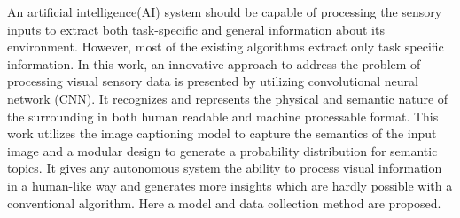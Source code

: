 An artificial intelligence(AI) system should be capable of processing the sensory inputs to extract both task-specific and general information about its environment. However, most of the existing algorithms extract only task specific information. In this work, an innovative approach to address the problem of processing visual sensory data is presented by utilizing convolutional neural network (CNN). It recognizes and represents the physical and semantic nature of the surrounding in both human readable and machine processable format. This work utilizes the image captioning model to capture the semantics of the input image and a modular design to generate a probability distribution for semantic topics. It gives any autonomous system the ability to process visual information in a human-like way and generates more insights which are hardly possible with a conventional algorithm. Here a model and data collection method are proposed.
